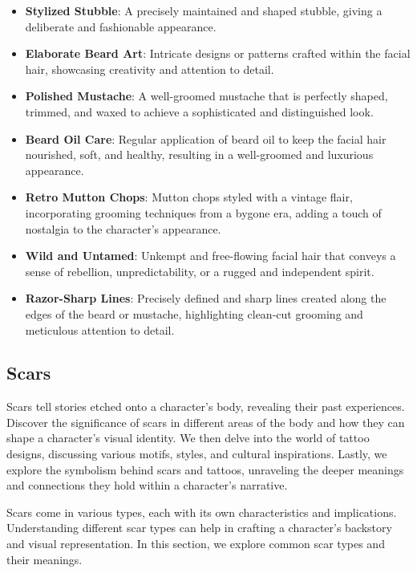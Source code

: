 \documentclass[12pt]{book}
\begin{document}
\begin{itemize}
    \item \textbf{Stylized Stubble}: A precisely maintained and shaped stubble, giving a deliberate and fashionable appearance.
    \item \textbf{Elaborate Beard Art}: Intricate designs or patterns crafted within the facial hair, showcasing creativity and attention to detail.
    \item \textbf{Polished Mustache}: A well-groomed mustache that is perfectly shaped, trimmed, and waxed to achieve a sophisticated and distinguished look.
    \item \textbf{Beard Oil Care}: Regular application of beard oil to keep the facial hair nourished, soft, and healthy, resulting in a well-groomed and luxurious appearance.
    \item \textbf{Retro Mutton Chops}: Mutton chops styled with a vintage flair, incorporating grooming techniques from a bygone era, adding a touch of nostalgia to the character's appearance.
    \item \textbf{Wild and Untamed}: Unkempt and free-flowing facial hair that conveys a sense of rebellion, unpredictability, or a rugged and independent spirit.
    \item \textbf{Razor-Sharp Lines}: Precisely defined and sharp lines created along the edges of the beard or mustache, highlighting clean-cut grooming and meticulous attention to detail.
\end{itemize}

\subsection{\textbf{Scars}}

Scars tell stories etched onto a character's body, revealing their past experiences. Discover the significance of scars in different areas of the body and how they can shape a character's visual identity. We then delve into the world of tattoo designs, discussing various motifs, styles, and cultural inspirations. Lastly, we explore the symbolism behind scars and tattoos, unraveling the deeper meanings and connections they hold within a character's narrative.

Scars come in various types, each with its own characteristics and implications. Understanding different scar types can help in crafting a character's backstory and visual representation. In this section, we explore common scar types and their meanings.
\end{document}
